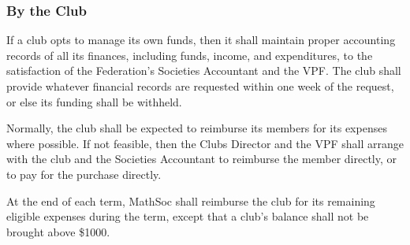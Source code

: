 \subsubsection{By the Club}
If a club opts to manage its own funds, then it shall maintain proper accounting
records of all its finances, including funds, income, and expenditures, to the
satisfaction of the Federation's Societies Accountant and the VPF. The club
shall provide whatever financial records are requested within one week of the
request, or else its funding shall be withheld.

Normally, the club shall be expected to reimburse its members for its expenses
where possible. If not feasible, then the Clubs Director and the VPF shall
arrange with the club and the Societies Accountant to reimburse the member
directly, or to pay for the purchase directly.

At the end of each term, MathSoc shall reimburse the club for its remaining
eligible expenses during the term, except that a club's balance shall not be
brought above \$1000.
